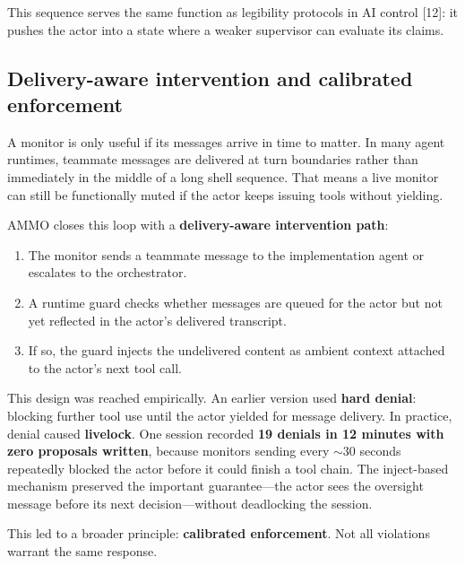 \documentclass[11pt]{article}
\begin{document}
This sequence serves the same function as legibility protocols in AI control [12]: it pushes the actor into a state where a weaker supervisor can evaluate its claims.

\subsection{Delivery-aware intervention and calibrated enforcement}
\label{sec:delivery}

A monitor is only useful if its messages arrive in time to matter. In many agent runtimes, teammate messages are delivered at turn boundaries rather than immediately in the middle of a long shell sequence. That means a live monitor can still be functionally muted if the actor keeps issuing tools without yielding.

AMMO closes this loop with a \textbf{delivery-aware intervention path}:

\begin{enumerate}[leftmargin=*,itemsep=2pt]
  \item The monitor sends a teammate message to the implementation agent or escalates to the orchestrator.
  \item A runtime guard checks whether messages are queued for the actor but not yet reflected in the actor's delivered transcript.
  \item If so, the guard injects the undelivered content as ambient context attached to the actor's next tool call.
\end{enumerate}

This design was reached empirically. An earlier version used \textbf{hard denial}: blocking further tool use until the actor yielded for message delivery. In practice, denial caused \textbf{livelock}. One session recorded \textbf{19 denials in 12 minutes with zero proposals written}, because monitors sending every ${\sim}30$ seconds repeatedly blocked the actor before it could finish a tool chain. The inject-based mechanism preserved the important guarantee---the actor sees the oversight message before its next decision---without deadlocking the session.

This led to a broader principle: \textbf{calibrated enforcement}. Not all violations warrant the same response.
\end{document}
